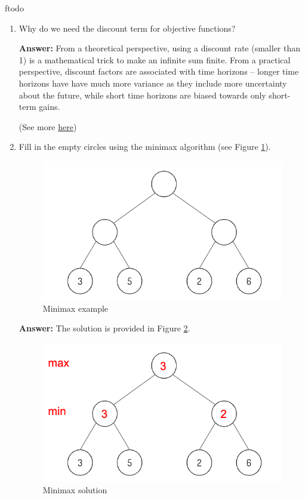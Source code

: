 ƒtodo\documentclass{article}
\newenvironment{QandA}{\begin{enumerate}[label=\arabic*.]}{\end{enumerate}}
\newenvironment{answer}{\par\normalfont \textbf{Answer:}}{}
\begin{document}
\begin{QandA}
\begin{answer}
        (Source: \href{https://www.quora.com/What-is-a-finite-horizon-in-the-context-of-reinforcement-learning}{Quora})
    \end{answer}

    \item Why do we need the discount term for objective functions?
    \begin{answer}
        From a theoretical perspective, using a discount rate (smaller than 1) is a mathematical trick to make an infinite sum finite. From a practical perspective, discount factors are associated with time horizons -- longer time horizons have have much more variance as they include more uncertainty about the future, while short time horizons are biased towards only short-term gains.

        (See more \href{https://stats.stackexchange.com/questions/221402/understanding-the-role-of-the-discount-factor-in-reinforcement-learning}{here})
    \end{answer}

    \item Fill in the empty circles using the minimax algorithm (see Figure \ref{fig:minimax}).
    
    \begin{figure}[h!]
        \centering
        \includegraphics[width=0.5\columnwidth]{img/minimax.png}
        \caption{Minimax example}
        \label{fig:minimax}
    \end{figure}
    \begin{answer}
        The solution is provided in Figure \ref{fig:minimax-sol}.
    \end{answer}
    \begin{figure}[h!]
        \centering
        \includegraphics[width=0.5\columnwidth]{img/minimax-sol.png}
        \caption{Minimax solution}
        \label{fig:minimax-sol}
    \end{figure}


\end{QandA}
\end{document}
